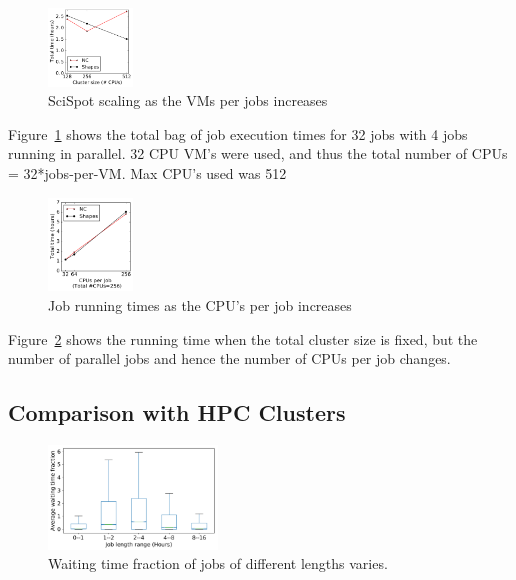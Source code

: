 \begin{figure}
  \includegraphics[width=0.2\textwidth]{../graphs/vm-per-job-scaling.pdf}
  \caption{SciSpot scaling as the VMs per jobs increases}
  \label{fig:vm-per-job-scaling}
\end{figure}

Figure~\ref{fig:vm-per-job-scaling} shows the total bag of job execution times for 32 jobs with 4 jobs running in parallel.
32 CPU VM's were used, and thus the total number of CPUs = 32*jobs-per-VM. Max CPU's used was 512 


\begin{figure}
  \includegraphics[width=0.2\textwidth]{../graphs/par-scaling.pdf}
  \caption{Job running times as the CPU's per job increases}
  \label{fig:par-scaling}
\end{figure}

Figure~\ref{fig:par-scaling} shows the running time when the total cluster size is fixed, but the number of parallel jobs and hence the number of CPUs per job changes. 



\subsection{Comparison with HPC Clusters}




\begin{figure}
  \includegraphics[width=0.4\textwidth]{../graphs/waiting_time_buckets.pdf}
  \caption{Waiting time fraction of jobs of different lengths varies.}
  \label{fig:hpc-wait-buckets}  
\end{figure}

